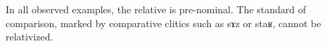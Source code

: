\documentclass[oldfontcommands,oneside,a4paper,11pt]{article}
\newcommand{\ipa}[1]{{\phon #1}} %
\newcommand{\topic}{\textsc{dem}}
\begin{document}
   In all observed examples, the relative is pre-nominal. 
The standard of comparison, marked by comparative clitics such as \ipa{sɤz} or \ipa{staʁ}, cannot be relativized. 

 

  



%
% 
% 
%
\end{document}
